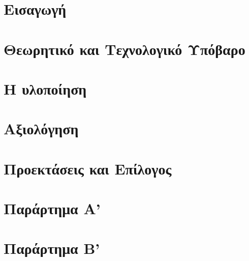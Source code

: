 \documentclass[a4paper,11pt,twoside]{book}
\author{\me}
\begin{document}
\setcounter{page}{3}



\clearemptydoublepage



\clearemptydoublepage



\clearemptydoublepage



\clearemptydoublepage



\clearemptydoublepage



\clearemptydoublepage

\pagestyle{fancy}

\tableofcontents
\clearemptydoublepage
\listoffigures
\clearemptydoublepage
\listoftables
\clearemptydoublepage


\setcounter{page}{1}

\mainmatter
\chapter{Εισαγωγή}


\clearemptydoublepage

\chapter{Θεωρητικό και Τεχνολογικό Υπόβαρο}

\clearemptydoublepage

\chapter{Η υλοποίηση}

\clearemptydoublepage

\chapter{Αξιολόγηση}

\clearemptydoublepage

\chapter{Προεκτάσεις και Επίλογος}

\clearemptydoublepage

\backmatter

\clearemptydoublepage

\chapter{Παράρτημα Α'}

\clearemptydoublepage

\chapter{Παράρτημα Β'}

\clearemptydoublepage


\end{document}
